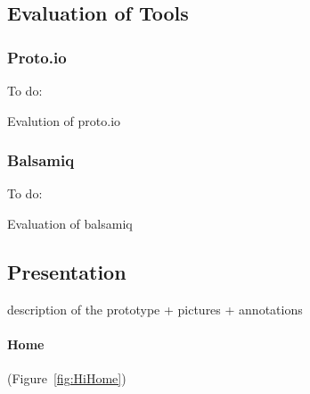 


\subsection{Evaluation of Tools}


\subsubsection{Proto.io}



To do:

Evalution of proto.io


\subsubsection{Balsamiq}



To do:

Evaluation of balsamiq


\subsection{Presentation}

description of the prototype + pictures + annotations


\paragraph{Home }

(Figure~\ref{fig:HiHome})


